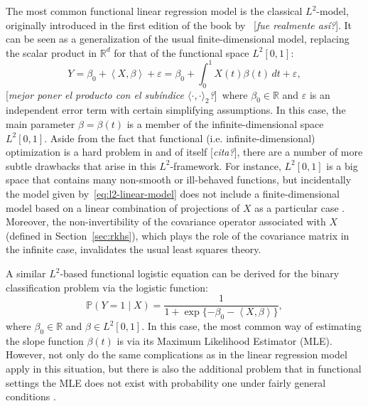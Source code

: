 \documentclass[ba]{imsart}
\numberwithin{equation}{section}
\theoremstyle{plain}
\renewcommand{\epsilon}{\varepsilon}
\newcommand{\R}{\mathbb{R}}
\newcommand\dotprod[2]{\left\langle #1, #2 \right\rangle}
\newcommand\incomment[1]{\color{red}[\textit{#1}]\color{black}}
\begin{document}
The most common functional linear regression model is the classical \(L^2\)-model, originally introduced in the first edition of the book by~\citet{ramsay2005functional} \incomment{fue realmente así?}. It can be seen as a generalization of the usual finite-dimensional model, replacing the scalar product in \(\R^d\) for that of the functional space \(L^2[0,1]\):
\begin{equation}\label{eq:l2-linear-model}
Y = \beta_0 + \dotprod{X}{\beta} + \epsilon = \beta_0 + \int_0^1 X(t)\beta(t)\, dt + \epsilon,
\end{equation}
\incomment{mejor poner el producto con el subíndice \(\langle \cdot , \cdot \rangle_2\)?}~where \(\beta_0\in \R\) and \(\epsilon\) is an independent error term with certain simplifying assumptions. In this case, the main parameter \(\beta=\beta(t)\) is a member of the infinite-dimensional space \(L^2[0, 1]\). Aside from the fact that functional (i.e. infinite-dimensional) optimization is a hard problem in and of itself \incomment{cita?}, there are a number of more subtle drawbacks that arise in this \(L^2\)-framework. For instance, \(L^2[0, 1]\) is a big space that contains many non-smooth or ill-behaved functions, but incidentally the model given by~\eqref{eq:l2-linear-model} does not include a finite-dimensional model based on a linear combination of projections of \(X\) as a particular case \citep[see][]{berrendero2019rkhs}. Moreover, the non-invertibility of the covariance operator associated with \(X\) (defined in Section~\ref{sec:rkhs}), which plays the role of the covariance matrix in the infinite case, invalidates the usual least squares theory.

A similar \(L^2\)-based functional logistic equation can be derived for the binary classification problem via the logistic function:
\begin{equation}\label{eq:l2-logistic-model}
  \mathbb P(Y=1 \mid X) = \frac{1}{1 + \exp\{-\beta_0 - \dotprod{X}{\beta}\}},
\end{equation}
where \(\beta_0 \in \R\) and \(\beta \in L^2[0, 1]\). In this case, the most common way of estimating the slope function \(\beta(t)\) is via its Maximum Likelihood Estimator (MLE). However, not only do the same complications as in the linear regression model apply in this situation, but there is also the additional problem that in functional settings the MLE does not exist with probability one under fairly general conditions \citep[see][Sec.~3.2]{buenolarraz2021functional}.
\end{document}
